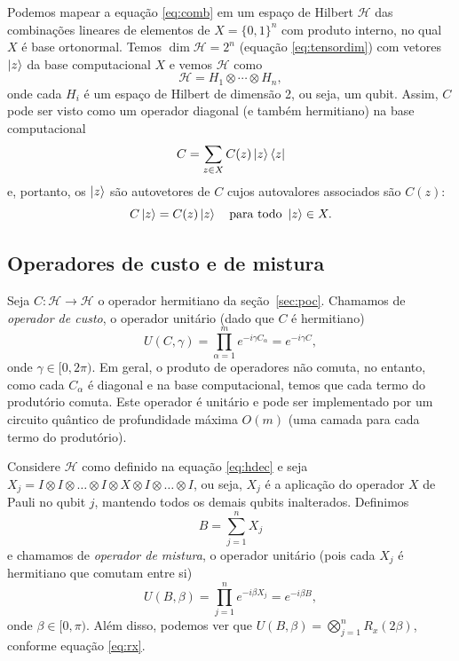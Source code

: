 Podemos mapear a equação \eqref{eq:comb} em um espaço de Hilbert $\mathcal{H}$ das combinações lineares de elementos de $X=\{0,1\}^n$ com produto interno, no qual $X$ é base ortonormal. Temos $\dim \mathcal{H}= 2^n$ (equação \eqref{eq:tensordim}) com vetores $\ket{z}$ da base computacional $X$ e vemos $\mathcal{H}$ como
\begin{equation}\label{eq:hdec}
    \mathcal{H} = H_1\otimes \cdots \otimes H_n,
\end{equation}
onde cada $H_i$ é um espaço de Hilbert de dimensão 2, ou seja, um qubit. Assim, $C$ pode ser visto como um operador diagonal (e também hermitiano) na base computacional
\begin{equation}
    C = \sum_{z\in X} C(z)\ket{z}\bra{z}
\end{equation}
e, portanto, os $\ket{z}$ são autovetores de $C$ cujos autovalores associados são $C(z)$:
\begin{equation}\label{eq:qaoaav}
    C\ket{z} = C(z)\ket{z} \quad \text{para todo } \ket{z}\in X.
\end{equation}

\subsection{Operadores de custo e de mistura}

Seja $C: \mathcal{H}\to \mathcal{H}$ o operador hermitiano da seção~\ref{sec:poc}. Chamamos de \emph{operador de custo}, o operador unitário (dado que $C$ é hermitiano)
\begin{equation}\label{eq:uc}
    U(C, \gamma) = \prod_{\alpha=1}^m e^{-i\gamma C_\alpha } = e^{-i\gamma C},
\end{equation}
onde $\gamma \in [0, 2\pi)$. Em geral, o produto de operadores não comuta, no entanto, como cada $C_\alpha$ é diagonal e na base computacional, temos que cada termo do produtório comuta. Este operador é unitário e pode ser implementado por um circuito quântico de profundidade máxima $O(m)$ (uma camada para cada termo do produtório).

Considere $\mathcal{H}$ como definido na equação \eqref{eq:hdec} e seja $X_j = I\otimes I\otimes \dotso \otimes I\otimes X \otimes I\otimes\dotso \otimes I$, ou seja, $X_j$ é a aplicação do operador $X$ de Pauli no qubit $j$, mantendo todos os demais qubits inalterados. Definimos
\begin{equation}
    B=\sum_{j=1}^n X_j
\end{equation}
e chamamos de \emph{operador de mistura}, o operador unitário (pois cada $X_j$ é hermitiano que comutam entre si)
\begin{equation}\label{eq:ub}
    U(B, \beta) = \prod_{j=1}^n e^{-i\beta X_j} = e^{-i\beta B},
\end{equation}
onde $\beta \in [0, \pi)$. Além disso, podemos ver que $U(B, \beta) = \bigotimes_{j=1}^n R_x(2\beta)$, conforme equação \eqref{eq:rx}.

